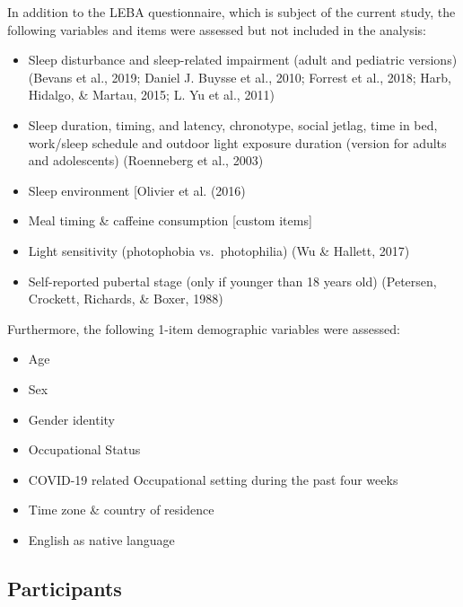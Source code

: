 \documentclass[
  english,
  man]{apa6}
\providecommand{\tightlist}{%
  \setlength{\itemsep}{0pt}\setlength{\parskip}{0pt}}
\begin{document}
In addition to the LEBA questionnaire, which is subject of the current study, the following variables and items were assessed but not included in the analysis:

\begin{itemize}
\tightlist
\item
  Sleep disturbance and sleep-related impairment (adult and pediatric versions) (Bevans et al., 2019; Daniel J. Buysse et al., 2010; Forrest et al., 2018; Harb, Hidalgo, \& Martau, 2015; L. Yu et al., 2011)
\item
  Sleep duration, timing, and latency, chronotype, social jetlag, time in bed, work/sleep schedule and outdoor light exposure duration (version for adults and adolescents) (Roenneberg et al., 2003)
\item
  Sleep environment {[}Olivier et al. (2016)\\
\item
  Meal timing \& caffeine consumption {[}custom items{]}
\item
  Light sensitivity (photophobia vs.~photophilia) (Wu \& Hallett, 2017)
\item
  Self-reported pubertal stage (only if younger than 18 years old) (Petersen, Crockett, Richards, \& Boxer, 1988)
\end{itemize}

Furthermore, the following 1-item demographic variables were assessed:

\begin{itemize}
\tightlist
\item
  Age
\item
  Sex
\item
  Gender identity
\item
  Occupational Status
\item
  COVID-19 related Occupational setting during the past four weeks
\item
  Time zone \& country of residence
\item
  English as native language
\end{itemize}

\hypertarget{participants}{%
\subsection{Participants}\label{participants}}
\end{document}
